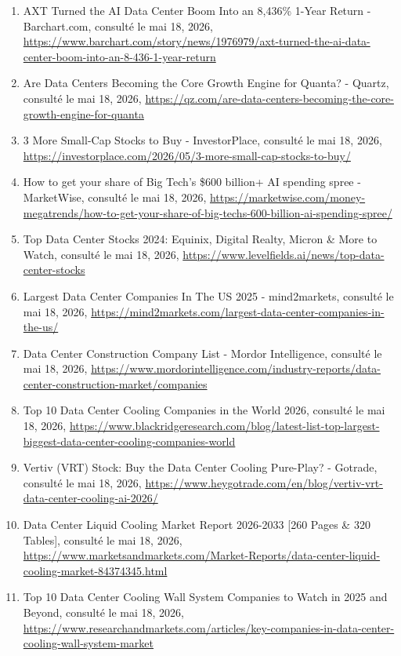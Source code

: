 \documentclass[11pt,a4paper]{article}
\begin{document}
\begin{enumerate}
    \item AXT Turned the AI Data Center Boom Into an 8,436\% 1-Year Return - Barchart.com, consulté le mai 18, 2026, \url{https://www.barchart.com/story/news/1976979/axt-turned-the-ai-data-center-boom-into-an-8-436-1-year-return}
    \item Are Data Centers Becoming the Core Growth Engine for Quanta? - Quartz, consulté le mai 18, 2026, \url{https://qz.com/are-data-centers-becoming-the-core-growth-engine-for-quanta}
    \item 3 More Small-Cap Stocks to Buy - InvestorPlace, consulté le mai 18, 2026, \url{https://investorplace.com/2026/05/3-more-small-cap-stocks-to-buy/}
    \item How to get your share of Big Tech's \$600 billion+ AI spending spree - MarketWise, consulté le mai 18, 2026, \url{https://marketwise.com/money-megatrends/how-to-get-your-share-of-big-techs-600-billion-ai-spending-spree/}
    \item Top Data Center Stocks 2024: Equinix, Digital Realty, Micron \& More to Watch, consulté le mai 18, 2026, \url{https://www.levelfields.ai/news/top-data-center-stocks}
    \item Largest Data Center Companies In The US 2025 - mind2markets, consulté le mai 18, 2026, \url{https://mind2markets.com/largest-data-center-companies-in-the-us/}
    \item Data Center Construction Company List - Mordor Intelligence, consulté le mai 18, 2026, \url{https://www.mordorintelligence.com/industry-reports/data-center-construction-market/companies}
    \item Top 10 Data Center Cooling Companies in the World 2026, consulté le mai 18, 2026, \url{https://www.blackridgeresearch.com/blog/latest-list-top-largest-biggest-data-center-cooling-companies-world}
    \item Vertiv (VRT) Stock: Buy the Data Center Cooling Pure-Play? - Gotrade, consulté le mai 18, 2026, \url{https://www.heygotrade.com/en/blog/vertiv-vrt-data-center-cooling-ai-2026/}
    \item Data Center Liquid Cooling Market Report 2026-2033 [260 Pages \& 320 Tables], consulté le mai 18, 2026, \url{https://www.marketsandmarkets.com/Market-Reports/data-center-liquid-cooling-market-84374345.html}
    \item Top 10 Data Center Cooling Wall System Companies to Watch in 2025 and Beyond, consulté le mai 18, 2026, \url{https://www.researchandmarkets.com/articles/key-companies-in-data-center-cooling-wall-system-market}

\end{enumerate}
\end{document}
